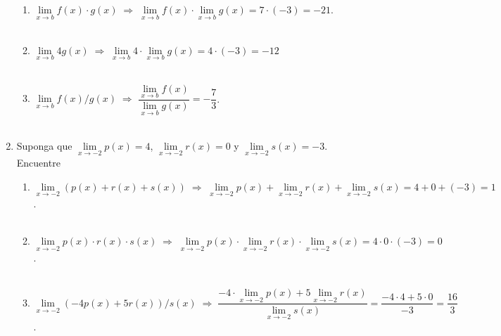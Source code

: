 \begin{enumerate}
\begin{enumerate}[\bfseries a)]
    \item $\lim\limits_{x\to b} f(x)\cdot g(x) \;\Longrightarrow \;\lim\limits_{x\to b}f(x) \cdot \lim\limits_{x\to b}g(x) = 7\cdot (-3) = -21$.\\\\

    \item $\lim\limits_{x\to b}4g(x) \; \Longrightarrow \; \lim\limits_{x\to b} 4 \cdot \lim\limits_{x\to b} g(x) = 4\cdot (-3) = -12$\\\\

    \item $\lim\limits_{x\to b}f(x)/g(x) \; \Longrightarrow \; \dfrac{\lim\limits_{x\to b}f(x)}{\lim\limits_{x\to b}g(x)} = -\dfrac{7}{3}$.\\\\

\end{enumerate}

\item  Suponga que $\lim\limits_{x\to -2}p(x) = 4$, $\lim\limits_{x\to -2} r(x) = 0$ y $\lim\limits_{x\to -2}s(x)=-3$. Encuentre
\begin{enumerate}[\bfseries a)]

    \item $\lim\limits_{x\to -2}(p(x)+r(x)+s(x)) \; \Longrightarrow \; \lim\limits_{x\to -2} p(x) + \lim\limits_{x\to -2}r(x) + \lim\limits_{x\to -2}s(x) = 4+0+(-3) = 1$.\\\\

    \item $\lim\limits_{x\to -2} p(x)\cdot r(x)\cdot s(x)\; \Longrightarrow \; \lim\limits_{x\to -2} p(x) \cdot \lim\limits_{x\to -2}r(x) \cdot \lim\limits_{x\to -2}s(x) = 4\cdot 0 \cdot (-3) = 0$.\\\\

    \item $\lim\limits_{x\to -2}(-4p(x)+5r(x))/s(x) \; \Longrightarrow \; \dfrac{-4\cdot \lim\limits_{x\to -2}p(x)+5\lim\limits_{x\to -2}r(x)}{\lim\limits_{x\to -2}s(x)} = \dfrac{-4\cdot 4 + 5 \cdot 0}{-3} = \dfrac{16}{3}$.\\\\

\end{enumerate}


\end{enumerate}
